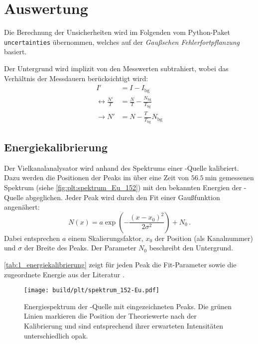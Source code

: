 \section{Auswertung}
\label{sec:auswertung}
Die Berechnung der Unsicherheiten wird im Folgenden vom Python-Paket \texttt{uncertainties} übernommen,
welches auf der \emph{Gaußschen Fehlerfortpflanzung} basiert.

Der Untergrund wird implizit von den Messwerten subtrahiert,
wobei das Verhältnis der Messdauern berücksichtigt wird:
\begin{align*}
    I' &= I - I_\text{bg} \\
    \leftrightarrow
    \frac{N'}{T} &= \frac{N}{T} - \frac{N_\text{bg}}{T_\text{bg}} \\
    \rightarrow
    N' &= N - \frac{T_{\phantom{\text{bg}}}}{T_\text{bg}} N_\text{bg}
\end{align*}


\subsection{Energiekalibrierung} \label{sec:auswertung:energiekalibrierung}
Der Vielkanalanalysator wird anhand des Spektrums einer -Quelle kalibriert.
Dazu werden die Positionen der Peaks im
    über eine Zeit von $\SI{56.5}{\minute}$ gemessenen
Spektrum (siehe \autoref{fig:plt:spektrum_Eu_152})
mit den bekannten Energien der -Quelle abgeglichen.
Jeder Peak wird durch den Fit einer Gaußfunktion angenähert:
\begin{equation}
    N(x) = a \exp\left(-\frac{(x - x_0)^2}{2 \sigma^2}\right) + N_0 \, .
    \label{eqn:gauss}
\end{equation}
Dabei entsprechen
    $a$ einem Skalierungsfaktor, %
    $x_0$ der Position (als Kanalnummer)
    und $\sigma$ der Breite
des Peaks.
Der Parameter $N_0$ beschreibt den Untergrund.

\autoref{tab:1_energiekalibrierung} zeigt für jeden Peak
    die Fit-Parameter sowie die zugeordnete Energie aus der Literatur \cite{lara}.

\begin{figure}
    \centering
    \texttt{[image: build/plt/spektrum\_152-Eu.pdf]}
    \caption{
        Energiespektrum der -Quelle mit eingezeichneten Peaks.
        Die grünen Linien markieren die Position der Theoriewerte nach der Kalibrierung
        und sind entsprechend ihrer erwarteten Intensitäten unterschiedlich opak.
    }
    \label{fig:plt:spektrum_Eu_152}
\end{figure}


